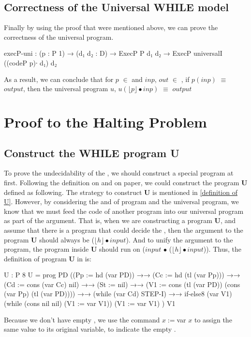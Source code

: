 \subsection{Correctness of the Universal WHILE model}\label{definition: simulation proof}
Finally by using the proof that were mentioned above, we can prove the correctness of the universal \WHILE program.
\begin{code}
execP-uni :  (p : P 1) → (d₁ d₂ : D)
             → ExecP P d₁ d₂
             → ExecP universalI ((codeP p)∙ d₁) d₂
\end{code}
As a result, we can conclude that for $p$ $\in$  and $inp$, $out$ $\in$ , if $p(inp)$ $\equiv$ $output$, then the universal \WHILE program $u$, $u(\lfloor p \rfloor \bullet inp)$ $\equiv$ $output$

\section{Proof to the Halting Problem}\label{definition: halting problem}
\subsection{Construct the WHILE program U}
To prove the undecidability of the , we should construct a special \WHILE program at first.
Following the definition on \cite{_halting_2015} and on paper\cite{boyer_mechanical_1984}, we could construct the program \textbf{U} defined as following.
The strategy to construct \textbf{U} is mentioned in \ref{definition of U}.
However, by considering the  and  of \WHILE program and the universal \WHILE program, we know that we must feed the code of another program into our universal program as part of the argument.
That is, when we are constructing a program \textbf{U}, and assume that there is a program  that could decide the , then the argument to the program \textbf{U} should always be ($\lfloor h\rfloor \bullet input$).
And to unify the argument to the program, the program  inside \textbf{U} should run on ($input$ $\bullet$ ($\lfloor h\rfloor \bullet input$)).
Thus, the definition of program \textbf{U} in \Agda is:
\begin{code}[fontsize=\small]
U : P 8
U = prog PD ((Pp := hd (var PD))
            →→
            (Cc := hd (tl (var Pp)))
            →→
            (Cd := cons (var Cc) nil)
            →→
            (St := nil)
            →→
            (V1 := cons (tl (var PD)) (cons  (var Pp) (tl (var PD))))
            →→
            (while (var Cd) STEP-I)
            →→
            if-else8 (var V1) (while (cons nil nil) (V1 := var V1)) 
			      (V1 := var V1)
            )
          V1
\end{code}
Because we don't have empty , we use the command $x := $var $x$ to assign the same value to its original variable, to indicate the empty .
